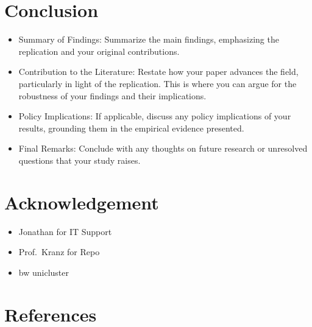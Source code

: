 \documentclass[
]{article}
\providecommand{\tightlist}{%
  \setlength{\itemsep}{0pt}\setlength{\parskip}{0pt}}\usepackage{longtable,booktabs,array}
\begin{document}
\section{Conclusion}\label{conclusion}

\begin{itemize}
\tightlist
\item
  Summary of Findings: Summarize the main findings, emphasizing the
  replication and your original contributions.
\item
  Contribution to the Literature: Restate how your paper advances the
  field, particularly in light of the replication. This is where you can
  argue for the robustness of your findings and their implications.
\item
  Policy Implications: If applicable, discuss any policy implications of
  your results, grounding them in the empirical evidence presented.
\item
  Final Remarks: Conclude with any thoughts on future research or
  unresolved questions that your study raises.
\end{itemize}

\section{Acknowledgement}\label{acknowledgement}

\begin{itemize}
\tightlist
\item
  Jonathan for IT Support
\item
  Prof.~Kranz for Repo
\item
  bw unicluster
\end{itemize}

\newpage{}

\section{References}\label{references}
\end{document}
